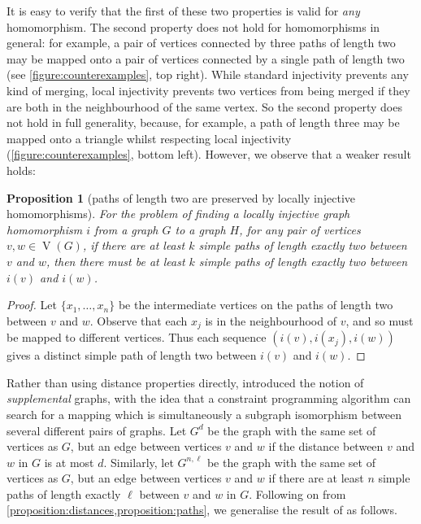 \documentclass{article}
\newtheorem{proposition}{Proposition}
\newcommand{\citet}[1]{\citeauthor{#1} \shortcite{#1}}
\newcommand{\vertexset}{\operatorname{V}}
\begin{document}
It is easy to verify that the first of these two properties is valid for \emph{any} homomorphism.
The second property does not hold for homomorphisms in general: for example, a pair of vertices
connected by three paths of length two may be mapped onto a pair of vertices connected by a single
path of length two (see \cref{figure:counterexamples}, top right). While standard injectivity
prevents any kind of merging, local injectivity prevents two vertices from being merged if they are
both in the neighbourhood of the same vertex.  So the second property does not hold in full
generality, because, for example, a path of length three may be mapped onto a triangle whilst
respecting local injectivity (\cref{figure:counterexamples}, bottom left).  However, we observe that
a weaker result holds:

\begin{proposition}[paths of length two are preserved by locally injective
    homomorphisms]\label{proposition:paths}For the problem of finding a locally injective graph
    homomorphism $i$ from a graph $G$ to a graph $H$, for any pair of vertices $v, w \in
    \vertexset(G)$, if there are at least $k$ simple paths of length exactly two between $v$ and
    $w$, then there must be at least $k$ simple paths of length exactly two between $i(v)$ and
    $i(w)$.
\end{proposition}

\begin{proof}Let $\{ x_1, \ldots, x_n \}$ be the intermediate vertices on the paths of length two
between $v$ and $w$. Observe that each $x_j$ is in the neighbourhood of $v$, and so must be mapped
    to different vertices. Thus each sequence $(i(v), i(x_j), i(w))$ gives a distinct simple path of
length two between $i(v)$ and $i(w)$.\end{proof}

Rather than using distance properties directly, \citet{DBLP:conf/cp/McCreeshP15} introduced
the notion of \emph{supplemental} graphs, with the idea that a constraint programming algorithm can
search for a mapping which is simultaneously a subgraph isomorphism between several different pairs
of graphs. Let $G^d$ be the graph with the same set of vertices as $G$, but an edge between vertices
$v$ and $w$ if the distance between $v$ and $w$ in $G$ is at most $d$.  Similarly, let $G^{n,\ell}$
be the graph with the same set of vertices as $G$, but an edge between vertices $v$ and $w$ if there
are at least $n$ simple paths of length exactly $\ell$ between $v$ and $w$ in $G$. Following on from
\cref{proposition:distances,proposition:paths}, we generalise the result of
\citeauthor{DBLP:conf/cp/McCreeshP15} as follows.
\end{document}
